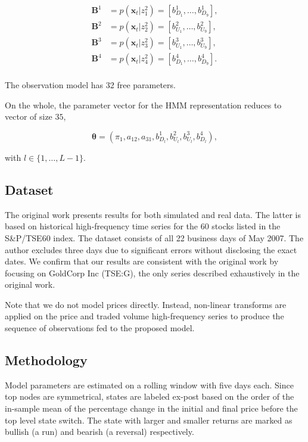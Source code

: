 \documentclass[]{article}
\newcommand{\mat}[1]{\bm{#1}}
\begin{document}
\[
\begin{aligned}
\mat{B}^1 &= p(\mat{x}_t | z_1^2) = \left[b^{1}_{D_1}, \dots, b^{1}_{D_9} \right], \\
\mat{B}^2 &= p(\mat{x}_t | z_2^2) = \left[b^{2}_{U_1}, \dots, b^{2}_{U_9} \right], \\
\mat{B}^3 &= p(\mat{x}_t | z_3^2) = \left[b^{3}_{U_1}, \dots, b^{3}_{U_9} \right], \\
\mat{B}^4 &= p(\mat{x}_t | z_4^2) = \left[b^{4}_{D_1}, \dots, b^{4}_{D_9} \right]. \\
\end{aligned}
\]

The observation model has 32 free parameters.

On the whole, the parameter vector for the HMM representation reduces to
vector of size \(35\),

\[
\mat{\theta} = (\pi_1, a_{12}, a_{31}, b^1_{D_l}, b^2_{U_l}, b^3_{U_l}, b^4_{D_l}),
\]

with \(l \in \{1, \dots, L-1\}\).

\subsection{Dataset}\label{dataset}

The original work presents results for both simulated and real data. The
latter is based on historical high-frequency time series for the 60
stocks listed in the S\&P/TSE60 index. The dataset consists of all 22
business days of May 2007. The author excludes three days due to
significant errors without disclosing the exact dates. We confirm that
our results are consistent with the original work by focusing on
GoldCorp Inc (TSE:G), the only series described exhaustively in the
original work.

Note that we do not model prices directly. Instead, non-linear
transforms are applied on the price and traded volume high-frequency
series to produce the sequence of observations fed to the proposed
model.

\subsection{Methodology}\label{methodology}

\label{sec:methodology}

Model parameters are estimated on a rolling window with five days each.
Since top nodes are symmetrical, states are labeled ex-post based on the
order of the in-sample mean of the percentage change in the initial and
final price before the top level state switch. The state with larger and
smaller returns are marked as bullish (a run) and bearish (a reversal)
respectively.
\end{document}
